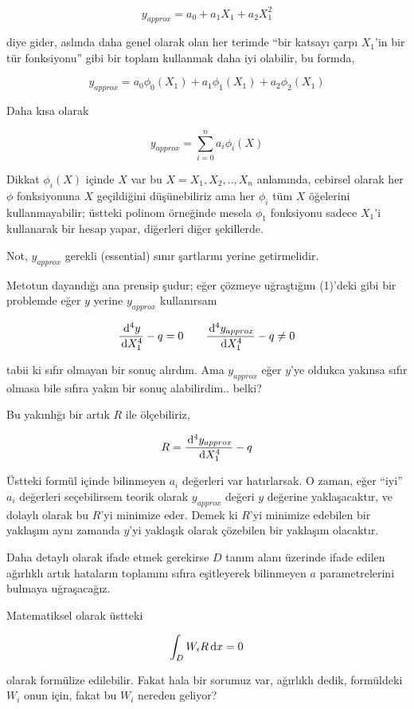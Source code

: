 \documentclass[12pt,fleqn]{article}\usepackage{../../common}
\begin{document}
$$
y_{approx} = a_0 + a_1 X_1 + a_2 X_1^2 
$$

diye gider, aslında daha genel olarak olan her terimde ``bir katsayı çarpı
$X_1$'in bir tür fonksiyonu'' gibi bir toplam kullanmak daha iyi olabilir,
bu formda,

$$
y_{approx} = a_0 \phi_0(X_1) + a_1 \phi_1(X_1) + a_2 \phi_2(X_1) 
$$

Daha kısa olarak

$$
y_{approx} = \sum_{i=0}^{n} a_i \phi_i(X) 
$$

Dikkat $\phi_i(X)$ içinde $X$ var bu $X = X_1,X_2,..,X_n$ anlamında, cebirsel
olarak her $\phi$ fonksiyonuna $X$ geçildiğini düşünebiliriz ama her $\phi_i$
tüm $X$ öğelerini kullanmayabilir; üstteki polinom örneğinde mesela $\phi_1$
fonksiyonu sadece $X_1$'i kullanarak bir hesap yapar, diğerleri diğer şekillerde.

Not, $y_{approx}$ gerekli (essential) sınır şartlarını yerine getirmelidir.

Metotun dayandığı ana prensip şudur; eğer çözmeye uğraştığım (1)'deki gibi bir
problemde eğer $y$ yerine $y_{approx}$ kullanırsam

$$
\frac{\,\mathrm{d}^4 y}{\,\mathrm{d} X_1^4} - q = 0 \qquad
\frac{\,\mathrm{d}^4 y_{approx}}{\,\mathrm{d} X_1^4} - q \ne 0
$$

tabii ki sıfır olmayan bir sonuç alırdım. Ama $y_{approx}$ eğer $y$'ye oldukca
yakınsa sıfır olmasa bile sıfıra yakın bir sonuç alabilirdim.. belki?

Bu yakınlığı bir artık $R$ ile ölçebiliriz,

$$
R = \frac{\,\mathrm{d}^4 y_{approx}}{\,\mathrm{d} X_1^4} - q 
$$

Üstteki formül içinde bilinmeyen $a_i$ değerleri var hatırlarsak. O zaman, eğer
``iyi'' $a_i$ değerleri seçebilirsem teorik olarak $y_{approx}$ değeri $y$
değerine yaklaşacaktır, ve dolaylı olarak bu $R$'yi minimize eder. Demek ki
$R$'yi minimize edebilen bir yaklaşım aynı zamanda $y$'yi yaklaşık olarak
çözebilen bir yaklaşım olacaktır. 

Daha detaylı olarak ifade etmek gerekirse $D$ tanım alanı üzerinde ifade edilen
ağırlıklı artık hataların toplamını sıfıra eşitleyerek bilinmeyen $a$
parametrelerini bulmaya uğraşacağız.

Matematiksel olarak üstteki

$$
\int_D W_i R \,\mathrm{d} x = 0
$$

olarak formülize edilebilir. Fakat hala bir sorumuz var, ağırlıklı dedik,
formüldeki $W_i$ onun için, fakat bu $W_i$ nereden geliyor?
\end{document}
